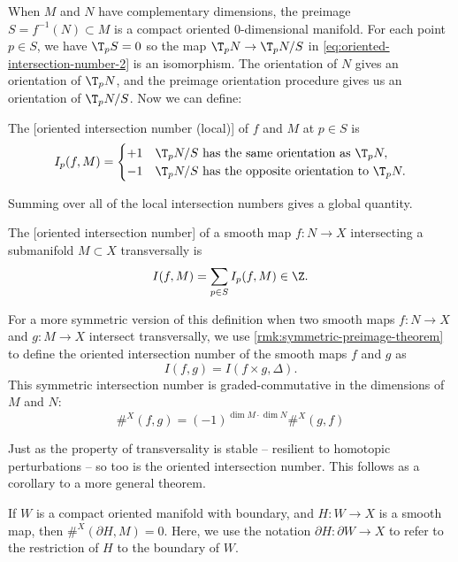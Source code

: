 When $M$ and $N$ have complementary dimensions, the preimage $S=f^{-1}(N)\subset M$ is a compact oriented $0$-dimensional manifold. For each point $p\in S$, we have $\T_p S=0$ so the map $\T_p N\to \T_p N/S$ in \cref{eq:oriented-intersection-number-2} is an isomorphism. The orientation of $N$ gives an orientation of $\T_p N$, and the preimage orientation procedure gives us an orientation of $\T_p N/S$. Now we can define:

\begin{definition}
	The [oriented intersection number (local)] of $f$ and $M$ at $p\in S$ is
	\[
		I_p(f, M) = \begin{cases}
			+1 & \T_p N/S \textrm{ has the same orientation as } \T_p N,     \\
			-1 & \T_p N/S \textrm{ has the opposite orientation to } \T_p N.
		\end{cases}
	\]
\end{definition}
Summing over all of the local intersection numbers gives a global quantity.
\begin{definition}
	The [oriented intersection number] of a smooth map $f : N \to X$ intersecting a submanifold $M\subset X$ transversally is
	\[
		I(f, M) = \sum_{p\in S} I_p(f, M) \in \Z.
	\]
\end{definition}

\begin{remark}\label{rmk:symmetric-intersection-number}
	For a more symmetric version of this definition when two smooth maps $f : N \to X$ and $g : M \to X$ intersect transversally, we use \cref{rmk:symmetric-preimage-theorem} to define the oriented intersection number of the smooth maps $f$ and $g$ as
	\[
		I(f,g) = I(f\times g, \Delta).
	\]
	This symmetric intersection number is graded-commutative in the dimensions of $M$ and $N$:
	\begin{equation}\label{eq:intersection-number-graded-commutative}
		\#^X(f,g) = (-1)^{\dim M\cdot \dim N} \#^X(g,f)
	\end{equation}
\end{remark}

Just as the property of transversality is stable -- resilient to homotopic perturbations -- so too is the oriented intersection number. This follows as a corollary to a more general theorem.

\begin{theorem}
	If $W$ is a compact oriented manifold with boundary, and $H : W \to X$ is a smooth map, then $\#^X(\partial H, M)=0$. Here, we use the notation $\partial H : \partial W \to X$ to refer to the restriction of $H$ to the boundary of $W$.
\end{theorem}

